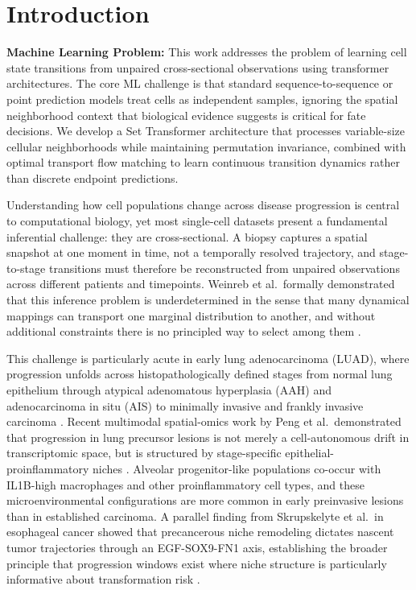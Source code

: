 \documentclass[conference]{IEEEtran}
\begin{document}
\section{Introduction}

\textbf{Machine Learning Problem:} This work addresses the problem of learning cell state transitions from unpaired cross-sectional observations using transformer architectures. The core ML challenge is that standard sequence-to-sequence or point prediction models treat cells as independent samples, ignoring the spatial neighborhood context that biological evidence suggests is critical for fate decisions. We develop a Set Transformer architecture that processes variable-size cellular neighborhoods while maintaining permutation invariance, combined with optimal transport flow matching to learn continuous transition dynamics rather than discrete endpoint predictions.

Understanding how cell populations change across disease progression is central to computational biology, yet most single-cell datasets present a fundamental inferential challenge: they are cross-sectional. A biopsy captures a spatial snapshot at one moment in time, not a temporally resolved trajectory, and stage-to-stage transitions must therefore be reconstructed from unpaired observations across different patients and timepoints. Weinreb et al.\ formally demonstrated that this inference problem is underdetermined in the sense that many dynamical mappings can transport one marginal distribution to another, and without additional constraints there is no principled way to select among them \cite{Weinreb2018-jq}.

This challenge is particularly acute in early lung adenocarcinoma (LUAD), where progression unfolds across histopathologically defined stages from normal lung epithelium through atypical adenomatous hyperplasia (AAH) and adenocarcinoma in situ (AIS) to minimally invasive and frankly invasive carcinoma \cite{Kadara2016-dt, Teixeira2019-yb}. Recent multimodal spatial-omics work by Peng et al.\ demonstrated that progression in lung precursor lesions is not merely a cell-autonomous drift in transcriptomic space, but is structured by stage-specific epithelial-proinflammatory niches \cite{Peng2025-xu}. Alveolar progenitor-like populations co-occur with IL1B-high macrophages and other proinflammatory cell types, and these microenvironmental configurations are more common in early preinvasive lesions than in established carcinoma. A parallel finding from Skrupskelyte et al.\ in esophageal cancer showed that precancerous niche remodeling dictates nascent tumor trajectories through an EGF-SOX9-FN1 axis, establishing the broader principle that progression windows exist where niche structure is particularly informative about transformation risk \cite{Skrupskelyte2026-zx}.
\end{document}
